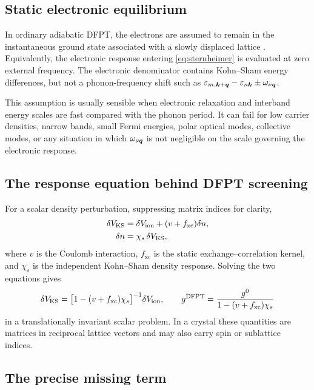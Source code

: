 \subsection{Static electronic equilibrium}

In ordinary adiabatic DFPT, the electrons are assumed to remain in the
instantaneous ground state associated with a slowly displaced lattice
\citep{Gonze1995,Baroni2001}.  Equivalently, the electronic response entering
\cref{eq:sternheimer} is evaluated at zero external frequency.  The electronic
denominator contains Kohn--Sham energy differences, but not a phonon-frequency
shift such as $\varepsilon_{m,\bm{k}+\bm{q}}-\varepsilon_{n\bm{k}}\pm\omega_{\nu\bm{q}}$.

This assumption is usually sensible when electronic relaxation and interband
energy scales are fast compared with the phonon period.  It can fail for low
carrier densities, narrow bands, small Fermi energies, polar optical modes,
collective modes, or any situation in which $\omega_{\nu\bm{q}}$ is not negligible
on the scale governing the electronic response.

\subsection{The response equation behind DFPT screening}

For a scalar density perturbation, suppressing matrix indices for clarity,
\begin{align}
  \delta V_{\mathrm{KS}}
  &= \delta V_{\mathrm{ion}}+(v+f_{\mathrm{xc}})\delta n,
  \label{eq:vksresponse}\\
  \delta n &= \chi_s\,\delta V_{\mathrm{KS}},
  \label{eq:chisresponse}
\end{align}
where $v$ is the Coulomb interaction, $f_{\mathrm{xc}}$ is the static
exchange--correlation kernel, and $\chi_s$ is the independent Kohn--Sham density
response.  Solving the two equations gives
\begin{equation}
  \delta V_{\mathrm{KS}}
  = \bigl[1-(v+f_{\mathrm{xc}})\chi_s\bigr]^{-1}
    \delta V_{\mathrm{ion}},
  \qquad
  g^{\mathrm{DFPT}}
  = \frac{g^0}{1-(v+f_{\mathrm{xc}})\chi_s}
  \label{eq:gdfptscalar}
\end{equation}
in a translationally invariant scalar problem.  In a crystal these quantities are
matrices in reciprocal lattice vectors and may also carry spin or sublattice
indices.

\subsection{The precise missing term}

